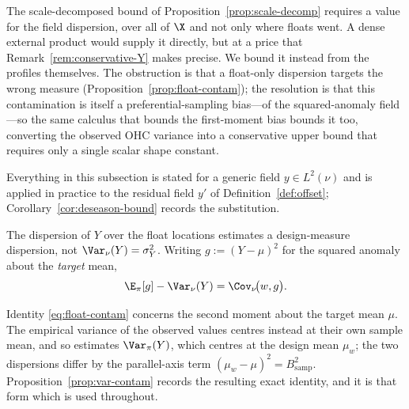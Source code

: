 The scale-decomposed bound of Proposition~\ref{prop:scale-decomp}
requires a value for the field dispersion, over all of $\X$ and not only
where floats went. A dense external product would supply it directly,
but at a price that Remark~\ref{rem:conservative-Y} makes precise. We
bound it instead from the profiles themselves. The obstruction is that a
float-only dispersion targets the wrong measure
(Proposition~\ref{prop:float-contam}); the resolution is that this
contamination is itself a preferential-sampling bias---of the
squared-anomaly field---so the same calculus that bounds the
first-moment bias bounds it too, converting the observed OHC variance
into a conservative upper bound that requires only a single scalar shape
constant.

Everything in this subsection is stated for a generic field
$y\in L^2(\nu)$ and is applied in practice to the residual field $y'$ of
Definition~\ref{def:offset}; Corollary~\ref{cor:deseason-bound} records
the substitution.

\begin{proposition}
\label{prop:float-contam}
The dispersion of $Y$ over the float locations estimates a design-measure
dispersion, not $\Var_\nu(Y)=\sigma_Y^2$. Writing $g:=(Y-\mu)^2$ for the
squared anomaly about the \emph{target} mean,
\begin{equation}
  \E_\pi[g]-\Var_\nu(Y)=\Cov_\nu\!\big(w,g\big).
  \label{eq:float-contam}
\end{equation}
\end{proposition}

Identity \eqref{eq:float-contam} concerns the second moment about the
target mean $\mu$. The empirical variance of the observed values centres
instead at their own sample mean, and so estimates $\Var_\pi(Y)$, which
centres at the design mean $\mu_w$; the two dispersions differ by the
parallel-axis term $(\mu_w-\mu)^2=B_{\mathrm{samp}}^2$.
Proposition~\ref{prop:var-contam} records the resulting exact identity,
and it is that form which is used throughout.

